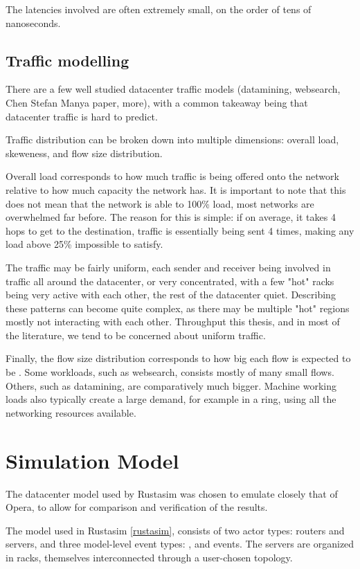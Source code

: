 The latencies involved are often extremely small, on the order of tens of nanoseconds.


\subsection{Traffic modelling} \label{model-traffic}

There are a few well studied datacenter traffic models (datamining, websearch, Chen Stefan Manya paper, more), with a common takeaway being that datacenter traffic is hard to predict.

Traffic distribution can be broken down into multiple dimensions: overall load, skeweness, and flow size distribution.


Overall load corresponds to how much traffic is being offered onto the network relative to how much capacity the network has.
It is important to note that this does not mean that the network is able to 100\% load, most networks are overwhelmed far before.
The reason for this is simple: if on average, it takes 4 hops to get to the destination, traffic is essentially being sent 4 times, making any load above 25\% impossible to satisfy.

The traffic may be fairly uniform, each sender and receiver being involved in traffic all around the datacenter, or very concentrated, with a few "hot" racks being very active with each other, the rest of the datacenter quiet.
Describing these patterns can become quite complex, as there may be multiple "hot" regions mostly not interacting with each other.
Throughput this thesis, and in most of the literature, we tend to be concerned about uniform traffic.

Finally, the flow size distribution corresponds to how big each flow is expected to be \cite{alizadeh_data_2010}.
Some workloads, such as websearch, consists mostly of many small flows.
Others, such as datamining, are comparatively much bigger.
Machine working loads also typically create a large demand, for example in a ring, using all the networking resources available.

\section{Simulation Model} \label{model-sim}

The datacenter model used by Rustasim was chosen to emulate closely that of Opera, to allow for comparison and verification of the results.

The model used in Rustasim \ref{rustasim}, consists of two actor types: routers and servers, and three model-level event types: ,  and  events.
The servers are organized in racks, themselves interconnected through a user-chosen topology.

